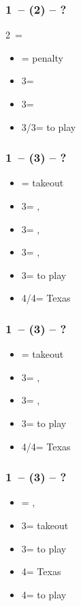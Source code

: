 \documentclass[12pt, a4paper]{report}
\begin{document}
{{{            \subsubsection*{1\ntx\ -- (2\nt) -- ?}
            2\nt\ = \minor
            \begin{itemize}
                \item \dbl = penalty
                \item 3\clubs = \invp\ \hearts\
                \item 3\diams = \invp\ \spades
                \item 3\hearts/3\spades = to play
            \end{itemize}

            \subsubsection*{1\ntx\ -- (3\clubs) -- ?}
            \begin{itemize}
                \item \dbl = takeout \gf
                \item 3\diams = \trsf{\hearts}, \invp
                \item 3\hearts = \trsf{\spades}, \invp
                \item 3\spades = \trsf{\diams}, \gf
                \item 3\nt = to play
                \item 4\diams/4\hearts = Texas
            \end{itemize}

            \subsubsection*{1\ntx\ -- (3\diams) -- ?}
            \begin{itemize}
                \item \dbl = takeout \gf
                \item 3\hearts = \trsf{\spades}, \invp
                \item 3\spades = \trsf{\hearts}, \gf
                \item 3\nt = to play
                \item 4\diams/4\hearts = Texas
            \end{itemize}

            \subsubsection*{1\ntx\ -- (3\hearts) -- ?}
            \begin{itemize}
                \item \dbl = \trsf{\spades}, \invp \vimp
                \item 3\spades = takeout \gf \vimp
                \item 3\nt = to play
                \item 4\hearts = Texas
                \item 4\spades = to play
            \end{itemize}

}}}
\end{document}
